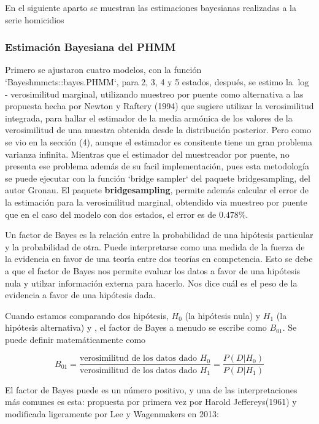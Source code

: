 \documentclass[a4paper]{article}\usepackage[]{graphicx}\usepackage[]{color}
\begin{document}
En el siguiente aparto se muestran las estimaciones bayesianas realizadas a la serie homicidios


\clearpage

\subsubsection*{Estimación Bayesiana del PHMM}





Primero se ajustaron cuatro modelos, con la función `Bayeshmmcts::bayes.PHMM`, para 2, 3, 4 y 5 estados, después, se estimo la $\log$ - verosimilitud marginal, utilizando muestreo por puente como alternativa a las propuesta hecha por Newton y Raftery (1994) que sugiere utilizar la verosimilitud integrada, para hallar el estimador de la media armónica de los valores de la verosimilitud de una muestra obtenida desde la distribución posterior. Pero como se vio en la sección (4), aunque el estimador es consitente tiene un gran problema varianza infinita. Mientras que el estimador del muestreador por puente, no presenta ese problema además de su facil implementación, pues esta metodología se puede ejecutar con la función `bridge sampler` del paquete bridgesampling, del autor Gronau. El paquete \textbf{bridgesampling}, permite además calcular el error de la estimación para la verosimilitud marginal, obtendido via muestreo por puente que en el caso del modelo con dos estados, el error es de $0.478 \%$. 

Un factor de Bayes es la relación entre la probabilidad de una hipótesis particular y la probabilidad de otra. Puede interpretarse como una medida de la fuerza de la evidencia en favor de una teoría entre dos teorías en competencia. Esto se debe a que el factor de Bayes nos permite evaluar los datos a favor de una hipótesis nula y utilzar información externa para hacerlo. Nos dice cuál es el peso de la evidencia a favor de una hipótesis dada.

Cuando estamos comparando dos hipótesis, $H_0$ (la hipótesis nula) y $H_1$ (la hipótesis alternativa) y , el factor de Bayes a menudo se escribe como $B_{01}$. Se puede definir matemáticamente como

$$B_{01} = \frac{\text{verosimilitud de los datos dado $H_0$}}{\text{verosimilitud de los datos dado $H_1$}} = \frac{P(D | H_0)}{P(D | H_1)}$$

El factor de Bayes puede es un número positivo, y una de las interpretaciones más comunes es esta: propuesta por primera vez por Harold Jeffereys(1961) y modificada ligeramente por Lee y Wagenmakers en 2013:
\end{document}
